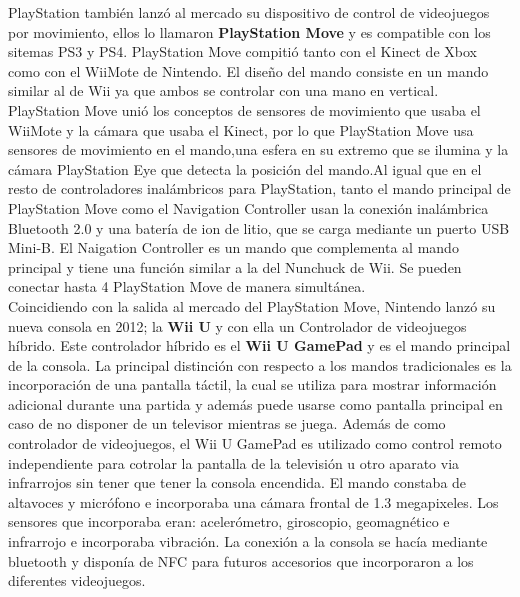 PlayStation tambi\'en lanz\'o al mercado su dispositivo de control de videojuegos por movimiento, ellos lo llamaron \textbf{PlayStation Move} y es compatible con los sitemas PS3 y PS4. PlayStation Move compiti\'o tanto con el Kinect de Xbox como con el WiiMote de Nintendo. El dise\~no del mando consiste en un mando similar al de Wii ya que ambos se controlar con una mano en vertical. PlayStation Move uni\'o los conceptos de sensores de movimiento que usaba el WiiMote y la c\'amara que usaba el Kinect, por lo que PlayStation Move usa sensores de movimiento en el mando,una esfera en su extremo que se ilumina y la c\'amara PlayStation Eye que detecta la posici\'on del mando.Al igual que en el resto de controladores inal\'ambricos para PlayStation, tanto el mando principal de PlayStation Move como el Navigation Controller usan la conexi\'on inal\'ambrica Bluetooth 2.0 y una bater\'ia de ion de litio, que se carga mediante un puerto USB Mini-B. El Naigation Controller es un mando que complementa al mando principal y tiene una funci\'on similar a la del Nunchuck de Wii. Se pueden conectar hasta 4 PlayStation Move de manera simult\'anea.\\
 
Coincidiendo con la salida al mercado del PlayStation Move, Nintendo lanz\'o su nueva consola en 2012; la \textbf{Wii U} y con ella un Controlador de videojuegos h\'ibrido. Este controlador h\'ibrido es el \textbf{Wii U GamePad} y es el mando principal de la consola. La principal distinci\'on con respecto a los mandos tradicionales es la incorporaci\'on de una pantalla t\'actil, la cual se utiliza para mostrar informaci\'on adicional durante una partida y adem\'as puede usarse como pantalla principal en caso de no disponer de un televisor mientras se juega. Adem\'as de como controlador de videojuegos, el Wii U GamePad es utilizado como control remoto independiente para cotrolar la pantalla de la televisi\'on u otro aparato via infrarrojos sin tener que tener la consola encendida. El mando constaba de altavoces y micr\'ofono e incorporaba una c\'amara frontal de 1.3 megapixeles. Los sensores que incorporaba eran: aceler\'ometro, giroscopio, geomagn\'etico e infrarrojo e incorporaba vibraci\'on. La conexi\'on a la consola se hac\'ia mediante bluetooth  y dispon\'ia de NFC para futuros accesorios que incorporaron a los diferentes videojuegos.\\

